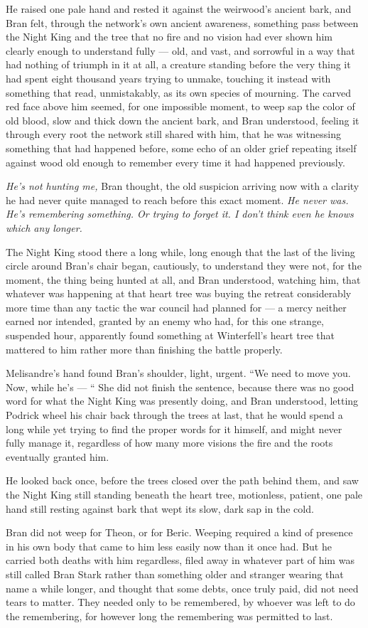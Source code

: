 He raised one pale hand and rested it against the weirwood’s ancient bark, and Bran felt, through the network’s own ancient awareness, something pass between the Night King and the tree that no fire and no vision had ever shown him clearly enough to understand fully — old, and vast, and sorrowful in a way that had nothing of triumph in it at all, a creature standing before the very thing it had spent eight thousand years trying to unmake, touching it instead with something that read, unmistakably, as its own species of mourning. The carved red face above him seemed, for one impossible moment, to weep sap the color of old blood, slow and thick down the ancient bark, and Bran understood, feeling it through every root the network still shared with him, that he was witnessing something that had happened before, some echo of an older grief repeating itself against wood old enough to remember every time it had happened previously.

\textit{He’s not hunting me,} Bran thought, the old suspicion arriving now with a clarity he had never quite managed to reach before this exact moment. \textit{He never was. He’s remembering something. Or trying to forget it. I don’t think even he knows which any longer.}

The Night King stood there a long while, long enough that the last of the living circle around Bran’s chair began, cautiously, to understand they were not, for the moment, the thing being hunted at all, and Bran understood, watching him, that whatever was happening at that heart tree was buying the retreat considerably more time than any tactic the war council had planned for — a mercy neither earned nor intended, granted by an enemy who had, for this one strange, suspended hour, apparently found something at Winterfell’s heart tree that mattered to him rather more than finishing the battle properly.

Melisandre’s hand found Bran’s shoulder, light, urgent. “We need to move you. Now, while he’s — “ She did not finish the sentence, because there was no good word for what the Night King was presently doing, and Bran understood, letting Podrick wheel his chair back through the trees at last, that he would spend a long while yet trying to find the proper words for it himself, and might never fully manage it, regardless of how many more visions the fire and the roots eventually granted him.

He looked back once, before the trees closed over the path behind them, and saw the Night King still standing beneath the heart tree, motionless, patient, one pale hand still resting against bark that wept its slow, dark sap in the cold.

Bran did not weep for Theon, or for Beric. Weeping required a kind of presence in his own body that came to him less easily now than it once had. But he carried both deaths with him regardless, filed away in whatever part of him was still called Bran Stark rather than something older and stranger wearing that name a while longer, and thought that some debts, once truly paid, did not need tears to matter. They needed only to be remembered, by whoever was left to do the remembering, for however long the remembering was permitted to last.